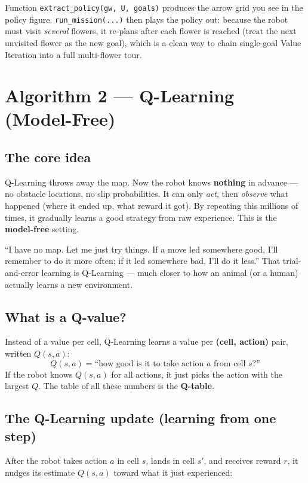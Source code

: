 \documentclass[11pt]{article}
\begin{document}
\begin{codebox}
Function \texttt{extract\_policy(gw, U, goals)} produces the arrow grid you see
in the policy figure. \texttt{run\_mission(...)} then plays the policy out:
because the robot must visit \emph{several} flowers, it re-plans after each
flower is reached (treat the next unvisited flower as the new goal), which is a
clean way to chain single-goal Value Iteration into a full multi-flower tour.
\end{codebox}

\section{Algorithm 2 --- Q-Learning (Model-Free)}

\subsection{The core idea}
Q-Learning throws away the map. Now the robot knows \textbf{nothing} in advance
--- no obstacle locations, no slip probabilities. It can only \emph{act}, then
\emph{observe} what happened (where it ended up, what reward it got). By
repeating this millions of times, it gradually learns a good strategy from raw
experience. This is the \textbf{model-free} setting.

\begin{intuition}
``I have no map. Let me just try things. If a move led somewhere good, I'll
remember to do it more often; if it led somewhere bad, I'll do it less.'' That
trial-and-error learning is Q-Learning --- much closer to how an animal (or a
human) actually learns a new environment.
\end{intuition}

\subsection{What is a Q-value?}
Instead of a value per cell, Q-Learning learns a value per
\textbf{(cell, action)} pair, written $Q(s,a)$:
\[
Q(s,a) = \text{``how good is it to take action } a \text{ from cell } s
\text{?''}
\]
If the robot knows $Q(s,a)$ for all actions, it just picks the action with the
largest $Q$. The table of all these numbers is the \textbf{Q-table}.

\subsection{The Q-Learning update (learning from one step)}
After the robot takes action $a$ in cell $s$, lands in cell $s'$, and receives
reward $r$, it nudges its estimate $Q(s,a)$ toward what it just experienced:
\end{document}
